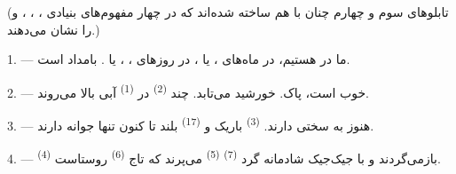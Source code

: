 %

\VUsaut{3.0mm}
\VUsaut{1.6mm}
\VUsaut{3.4mm}

(تابلوهای سوم و چهارم چنان با هم ساخته شده‌اند که در چهار  مفهوم‌های بنیادی ، ، ،
 و  را نشان می‌دهند.)

\VUsaut{4.0mm}
\VUsaut{3.0mm}

\VUsaut{2.4mm}

\VUsaut{3.0mm}

1. --- ما در  هستیم، در ماه‌های ،
 یا ، در روزهای ،
،  یا .
 بامداد است.

2. ---  خوب است،  پاک. خورشید می‌تابد.
چند  \textsuperscript{(2)} در 
\textsuperscript{(1)} آبی بالا می‌روند.

3. ---  هنوز به سختی  دارند.
 \textsuperscript{(3)} باریک و 
\textsuperscript{(17)} بلند تا کنون تنها جوانه دارند.

4. ---  \textsuperscript{(4)} بازمی‌گردند و با جیک‌جیک
شادمانه گرد  \textsuperscript{(7)} 
\textsuperscript{(5)} می‌پرند که تاج  \textsuperscript{(6)}
روستاست.

